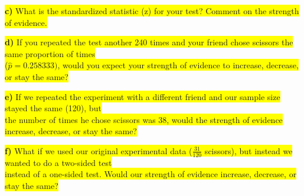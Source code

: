 \documentclass{article}
\newif\ifPrintSolution
\newcommand{\sol}[1]{\ifPrintSolution {\color{blue} #1 } \fi}
\begin{document}
\sol{Mean $\approx$ 0.333, SD $\approx$ 0.043.}

\vspace{0.25in}

\hspace{0.1in} \colorbox{yellow}{\textbf{c) } What is the standardized statistic (z) for your test? Comment on the strength of evidence.}

\sol{The z-score should be close to -1.74, which is moderate evidence against the null hypothesis that scissors is chosen randomly at a rate of $\frac{1}{3}$.\\
With Mean and SD above, $z = \frac{\frac{31}{120} - 0.333}{0.043} = \frac{0.258333 - 0.33333}{0.043} = -1.74$}

\vspace{0.25in}

\hspace{0.1in} \colorbox{yellow}{\textbf{d) } If you repeated the test another 240 times and your friend chose scissors the same proportion of times}\\ \colorbox{yellow}{ ($\hat{p} = 0.258333)$, would you expect your strength of evidence to increase, decrease, or stay the same?}

\sol{We would expect our strength of evidence to increase if the sample size is larger but the observed proportion is the same.}

\vspace{0.25in}

\hspace{0.1in} \colorbox{yellow}{\textbf{e) } If we repeated the experiment with a different friend and our sample size stayed the same (120), but }\\ \colorbox{yellow}{the number of times he chose scissors was 38, would the strength of evidence increase, decrease, or stay the same?}

\sol{We would expect the strength of evidence to decrease if the observed statistic is closer to the null (less distance) and the sample size stayed the same.}

\vspace{0.25in}

\hspace{0.1in} \colorbox{yellow}{\textbf{f) } What if we used our original experimental data ($\frac{31}{120}$ scissors), but instead we wanted to do a two-sided test}\\ \colorbox{yellow}{instead of a one-sided test. Would our strength of evidence increase, decrease, or stay the same?}
\end{document}
